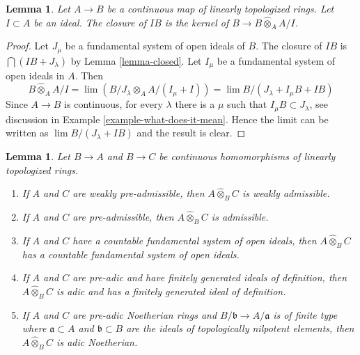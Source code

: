 \documentclass{stacks-project}
\theoremstyle{plain}
\newtheorem{lemma}[subsection]{Lemma}
\theoremstyle{definition}
\theoremstyle{remark}
\numberwithin{equation}{subsection}
\def\lim{\mathop{\mathrm{lim}}\nolimits}
\begin{document}
\begin{lemma}
\label{lemma-closure-image-ideal}
Let $A \to B$ be a continuous map of linearly topologized rings.
Let $I \subset A$ be an ideal. The closure of $IB$
is the kernel of $B \to B \widehat{\otimes}_A A/I$.
\end{lemma}

\begin{proof}
Let $J_\mu$ be a fundamental system of open ideals of $B$.
The closure of $IB$ is $\bigcap (IB + J_\lambda)$ by Lemma \ref{lemma-closed}.
Let $I_\mu$ be a fundamental system of open ideals in $A$.
Then
$$
B \widehat{\otimes}_A A/I = \lim (B/J_\lambda \otimes_A A/(I_\mu + I)) =
\lim B/(J_\lambda + I_\mu B + I B)
$$
Since $A \to B$ is continuous, for every $\lambda$ there
is a $\mu$ such that $I_\mu B \subset J_\lambda$, see discussion in
Example \ref{example-what-does-it-mean}. Hence the limit
can be written as $\lim B/(J_\lambda + IB)$ and the result is clear.
\end{proof}

\begin{lemma}
\label{lemma-completed-tensor-product}
Let $B \to A$ and $B \to C$ be continuous homomorphisms of
linearly topologized rings.
\begin{enumerate}
\item If $A$ and $C$ are weakly pre-admissible, then
$A \widehat{\otimes}_B C$ is weakly admissible.
\item If $A$ and $C$ are pre-admissible, then
$A \widehat{\otimes}_B C$ is admissible.
\item If $A$ and $C$ have a countable fundamental system of open
ideals, then $A \widehat{\otimes}_B C$ has a countable fundamental
system of open ideals.
\item If $A$ and $C$ are pre-adic and have finitely generated ideals
of definition, then $A \widehat{\otimes}_B C$ is adic and has
a finitely generated ideal of definition.
\item If $A$ and $C$ are pre-adic Noetherian rings and
$B/\mathfrak b \to A/\mathfrak a$ is of finite type
where $\mathfrak a \subset A$ and $\mathfrak b \subset B$
are the ideals of topologically nilpotent elements, then
$A \widehat{\otimes}_B C$ is adic Noetherian.
\end{enumerate}
\end{lemma}
\end{document}
